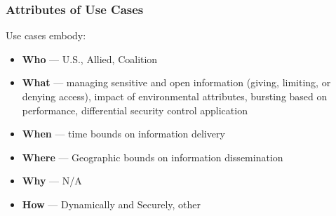 \documentclass[t,handout]{beamer}
\begin{document}
\begin{frame}
\frametitle{Attributes of Use Cases}
Use cases embody:
\begin{itemize}
\item {\bf Who} --- U.S., Allied, Coalition
\item {\bf What} --- managing sensitive and open information (giving, limiting, or denying access), impact of environmental attributes, bursting based on performance, differential security control application
\item {\bf When} --- time bounds on information delivery
\item {\bf Where} --- Geographic bounds on information dissemination
\item {\bf Why} --- N/A
\item {\bf How} --- Dynamically and Securely, other
\end{itemize}
\end{frame}
\end{document}
